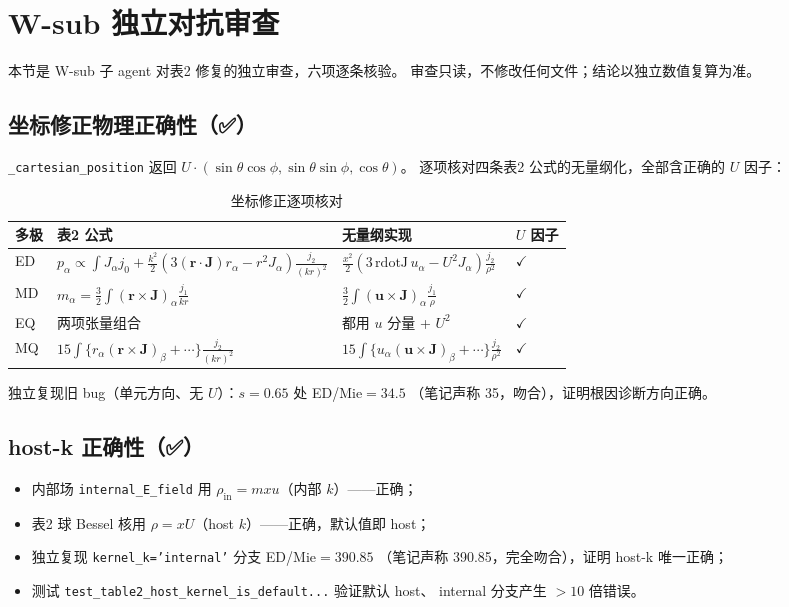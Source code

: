 \section{W-sub 独立对抗审查}

本节是 W-sub 子 agent 对表2 修复的独立审查，六项逐条核验。
审查只读，不修改任何文件；结论以独立数值复算为准。

\subsection{坐标修正物理正确性（✅）}

\texttt{\_cartesian\_position} 返回 $U\cdot(\sin\theta\cos\phi,\sin\theta\sin\phi,\cos\theta)$。
逐项核对四条表2 公式的无量纲化，全部含正确的 $U$ 因子：

\begin{table}[H]
\centering
\caption{坐标修正逐项核对}
\begin{tabular}{llll}
\toprule
\textbf{多极} & \textbf{表2 公式} & \textbf{无量纲实现} & \textbf{$U$ 因子} \\
\midrule
ED & $p_\alpha\propto\int J_\alpha j_0+\frac{k^2}{2}(3(\mathbf r\cdot\mathbf J)r_\alpha-r^2J_\alpha)\frac{j_2}{(kr)^2}$ & $\frac{x^2}{2}(3\,\mathrm{rdotJ}\,u_\alpha-U^2J_\alpha)\frac{j_2}{\rho^2}$ & $\checkmark$ \\
MD & $m_\alpha=\frac32\int(\mathbf r\times\mathbf J)_\alpha\frac{j_1}{kr}$ & $\frac32\int(\mathbf u\times\mathbf J)_\alpha\frac{j_1}{\rho}$ & $\checkmark$ \\
EQ & 两项张量组合 & 都用 $u$ 分量 + $U^2$ & $\checkmark$ \\
MQ & $15\int\{r_\alpha(\mathbf r\times\mathbf J)_\beta+\cdots\}\frac{j_2}{(kr)^2}$ & $15\int\{u_\alpha(\mathbf u\times\mathbf J)_\beta+\cdots\}\frac{j_2}{\rho^2}$ & $\checkmark$ \\
\bottomrule
\end{tabular}
\end{table}

独立复现旧 bug（单元方向、无 $U$）：$s=0.65$ 处 ED/Mie$=34.5$
（笔记声称 35，吻合），证明根因诊断方向正确。

\subsection{host-k 正确性（✅）}

\begin{itemize}
  \item 内部场 \texttt{internal\_E\_field} 用 $\rho_{\mathrm{in}}=m x u$（内部 $k$）——正确；
  \item 表2 球 Bessel 核用 $\rho=xU$（host $k$）——正确，默认值即 host；
  \item 独立复现 \texttt{kernel\_k='internal'} 分支 ED/Mie$=390.85$
        （笔记声称 390.85，完全吻合），证明 host-k 唯一正确；
  \item 测试 \texttt{test\_table2\_host\_kernel\_is\_default...} 验证默认 host、
        internal 分支产生 $>10$ 倍错误。
\end{itemize}

